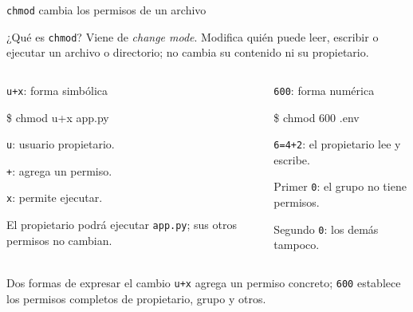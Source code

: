 \documentclass[aspectratio=169,10pt,c]{beamer}
\begin{document}
\begin{frame}{\texttt{chmod} cambia los permisos de un archivo}
\begin{block}{¿Qué es \texttt{chmod}?}
\small Viene de \emph{change mode}. Modifica quién puede leer, escribir o ejecutar un archivo o directorio; no cambia su contenido ni su propietario.
\end{block}
\begin{columns}[T,onlytextwidth]
\begin{exampleblock}{\texttt{u+x}: forma simbólica}
\begin{terminal}\footnotesize
\$ chmod u+x app.py
\end{terminal}
\small
\texttt{u}: usuario propietario.\par
\texttt{+}: agrega un permiso.\par
\texttt{x}: permite ejecutar.\par\smallskip
El propietario podrá ejecutar \texttt{app.py}; sus otros permisos no cambian.
\end{exampleblock}
\begin{exampleblock}{\texttt{600}: forma numérica}
\begin{terminal}\footnotesize
\$ chmod 600 .env
\end{terminal}
\small
\texttt{6=4+2}: el propietario lee y escribe.\par
Primer \texttt{0}: el grupo no tiene permisos.\par
Segundo \texttt{0}: los demás tampoco.
\end{exampleblock}
\end{columns}
\begin{alertblock}{Dos formas de expresar el cambio}
\small \texttt{u+x} agrega un permiso concreto; \texttt{600} establece los permisos completos de propietario, grupo y otros.
\end{alertblock}
\end{frame}
\end{document}
